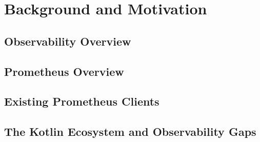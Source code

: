 %
%
\chapter{Background and Motivation} \label{ch:background}


\section{Observability Overview}
\lipsum[1]


\section{Prometheus Overview}
\lipsum[1]


\section{Existing Prometheus Clients}
\lipsum[1]


\section{The Kotlin Ecosystem and Observability Gaps}
\lipsum[1]